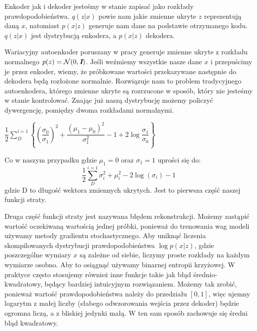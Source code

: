 \documentclass[a4paper,12pt]{book} %
\begin{document}
Enkoder jak i dekoder jesteśmy w stanie zapisać jako rozkłady prawdopodobieństwa. $q(z|x)$ powie nam jakie zmienne ukryte $z$ reprezentują daną $x$, natomiast $p(x|z)$ generuje nam dane na podstawie otrzymanego kodu. $q(z|x)$ jest dystrybucją enkodera, a $p(x|z)$ dekodera.

Wariacyjny autoenkoder poruszany w pracy generuje zmienne ukryte z rozkładu normalnego $p(z)=\mathcal{N}(0,\textit{\textbf{I}})$. Jeśli weźmiemy wszystkie nasze dane $x$ i przepuścimy je przez enkoder, wiemy, że próbkowane wartości przekazywane następnie do dekodera będą rozłożone normalnie. Rozwiązuje nam to problem tradycyjnego autoenkodera, którego zmienne ukryte są rozrzucone w sposób, który nie jesteśmy w stanie kontrolować. Znając już naszą dystrybucję możemy policzyć dywergencję, pomiędzy dwoma rozkładami normalnymi.
\begin{center}
	$\dfrac{1}{2}\displaystyle\sum_{D}^{i=1}\left\{\left(\dfrac{\sigma_0}{\sigma_1}\right)^2+\dfrac{(\mu_1 - \mu_0)^2}{\sigma_1^2} - 1 + 2\log\dfrac{\sigma_1}{\sigma_0}\right\}$
\end{center}
Co w naszym przypadku gdzie $\mu_1 = 0$ oraz $\sigma_1=1$ uprości się do:
\begin{equation}
	\dfrac{1}{2}\displaystyle\sum_{D}^{i=1}\sigma_i^2+\mu_i^2-2\log(\sigma_i)-1
	\label{equ:kld_loss}
\end{equation} 
gdzie D to długość wektora zmiennych ukrytych. Jest to pierwsza część naszej funkcji straty. 

Druga część funkcji straty jest nazywana błędem rekonstrukcji. Możemy zastąpić wartość oczekiwaną wartością jednej próbki, ponieważ do trenowania wag modeli używamy metody gradientu stochastycznego. Aby uniknąć liczenia skompilowanych dystrybucji prawdopodobieństwa $\log p(x|z)$, gdzie poszczególne wymiary $x$ są zależne od siebie, liczymy proste rozkłady na każdym wymiarze osobno. Aby to osiągnąć używamy binarnej entropii krzyżowej. W praktyce często stosujemy również inne funkcje takie jak błąd średnio-kwadratowy, będący bardziej intuicyjnym rozwiązaniem.
Możemy tak zrobić, ponieważ wartość prawdopodobieństwa należy do przedziału $\left[ 0, 1\right] $, więc ujemny logarytm z małej liczby (słabego odwzorowania wejścia przez dekoder) będzie ogromna liczą, a z bliskiej jedynki małą. W ten sam sposób zachowuje się średni błąd kwadratowy.
\newpage
\end{document}
